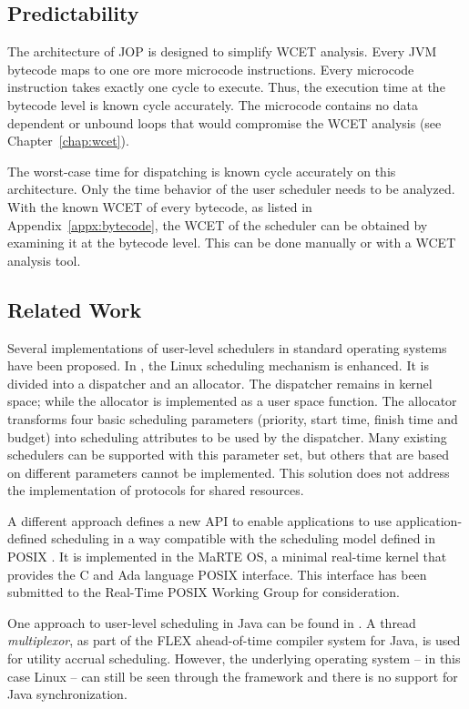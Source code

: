 \subsection{Predictability}

The architecture of JOP is designed to simplify WCET analysis. Every
JVM bytecode maps to one ore more microcode instructions. Every
microcode instruction takes exactly one cycle to execute. Thus, the
execution time at the bytecode level is known cycle accurately. The
microcode contains no data dependent or unbound loops that would
compromise the WCET analysis (see Chapter~\ref{chap:wcet}).

The worst-case time for dispatching is known cycle accurately on
this architecture. Only the time behavior of the user scheduler
needs to be analyzed. With the known WCET of every bytecode, as
listed in Appendix~\ref{appx:bytecode}, the WCET of the scheduler
can be obtained by examining it at the bytecode level. This can be
done manually or with a WCET analysis tool.

\subsection{Related Work}

Several implementations of user-level schedulers in standard
operating systems have been proposed. In \cite{REDLinux2003}, the
Linux scheduling mechanism is enhanced. It is divided into a
dispatcher and an allocator. The dispatcher remains in kernel space;
while the allocator is implemented as a user space function. The
allocator transforms four basic scheduling parameters (priority,
start time, finish time and budget) into scheduling attributes to be
used by the dispatcher. Many existing schedulers can be supported
with this parameter set, but others that are based on different
parameters cannot be implemented. This solution does not address the
implementation of protocols for shared resources.

A different approach defines a new API to enable applications to use
application-defined scheduling in a way compatible with the
scheduling model defined in POSIX \cite{787339}. It is implemented
in the MaRTE OS, a minimal real-time kernel that provides the C and
Ada language POSIX interface. This interface has been submitted to
the Real-Time POSIX Working Group for consideration.

One approach to user-level scheduling in Java can be found in
\cite{Feizabadi:2003:UAS}. A thread \emph{multiplexor}, as part of
the FLEX ahead-of-time compiler system for Java, is used for utility
accrual scheduling. However, the underlying operating system -- in
this case Linux -- can still be seen through the framework and there
is no support for Java synchronization.

